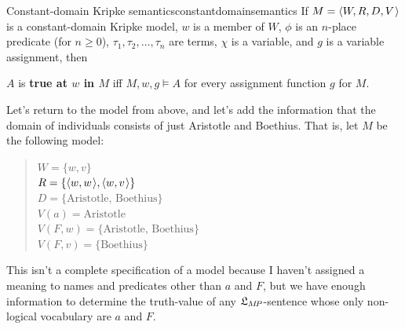 \begin{definition}{Constant-domain Kripke semantics}{constantdomainsemantics}
  If $\Mfr = \t{W,R,D,V}$ is a constant-domain Kripke model, $w$ is a member of
  $W$, $\phi$ is an $n$-place predicate (for $n\geq 0$),
  $\tau_1,\tau_{2},\ldots,\tau_{n}$ are terms, $\chi$ is a variable, and $g$ is a
  variable assignment, then
  
  \medskip
  \begin{semantics}
  \end{semantics}

  \medskip
  $A$ is \textbf{true at $w$ in $M$} iff $M,w,g \models A$ for
  every assignment function $g$ for $M$.

\end{definition}

Let's return to the model from above, and let's add the information that the
domain of individuals consists of just Aristotle and Boethius. That is, let $M$
be the following model:
%
\begin{quote}
  $W = \{ w,v \}$\\
  $R = \{ \t{w,w}, \t{w,v} \}$\\
  $D = \{ \text{Aristotle, Boethius} \}$\\
  $V(a) = \text{Aristotle}$\\
  $V(F,w) = \{ \text{Aristotle, Boethius} \}$\\
  $V(F,v) = \{ \text{Boethius} \}$
\end{quote}
%
This isn't a complete specification of a model because I haven't assigned a
meaning to names and predicates other than $a$ and $F$, but we have enough
information to determine the truth-value of any $\mathfrak{L}_{M\!P}$-sentence whose only
non-logical vocabulary are $a$ and $F$.

